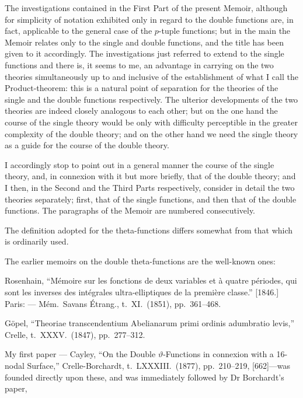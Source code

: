 \documentclass[11pt]{article}
\begin{document}
The investigations contained in the First Part of the present Memoir, although for simplicity of notation exhibited only in regard to the double functions are, in fact, applicable to the general case of the $p$-tuple functions; but in the main the Memoir relates only to the single and double functions, and the title has been given to it accordingly. The investigations just referred to extend to the single functions and there is, it seems to me, an advantage in carrying on the two theories simultaneously up to and inclusive of the establishment of what I call the Product-theorem: this is a natural point of separation for the theories of the single and the double functions respectively. The ulterior developments of the two theories are indeed closely analogous to each other; but on the one hand the course of the single theory would be only with difficulty perceptible in the greater complexity of the double theory; and on the other hand we need the single theory as a guide for the course of the double theory.

I accordingly stop to point out in a general manner the course of the single theory, and, in connexion with it but more briefly, that of the double theory; and I then, in the Second and the Third Parts respectively, consider in detail the two theories separately; first, that of the single functions, and then that of the double functions. The paragraphs of the Memoir are numbered consecutively.

The definition adopted for the theta-functions differs somewhat from that which is ordinarily used.

The earlier memoirs on the double theta-functions are the well-known ones:

\medskip

Rosenhain, ``M\'emoire sur les fonctions de deux variables et \`a quatre p\'eriodes, qui sont les inverses des int\'egrales ultra-elliptiques de la premi\`ere classe.'' [1846.] Paris: --- M\'em.\ Savans \'Etrang., t.\ XI.\ (1851), pp.\ 361--468.

\medskip

G\"opel, ``Theoriae transcendentium Abelianarum primi ordinis adumbratio levis,'' Crelle, t.\ XXXV.\ (1847), pp.\ 277--312.

\medskip

My first paper --- Cayley, ``On the Double $\vartheta$-Functions in connexion with a 16-nodal Surface,'' Crelle-Borchardt, t.\ LXXXIII.\ (1877), pp.\ 210--219, [662]---was founded directly upon these, and was immediately followed by Dr Borchardt's paper,
\end{document}
